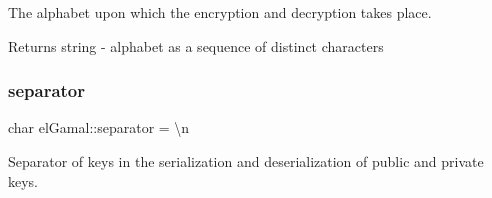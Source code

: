 The alphabet upon which the encryption and decryption takes place. 

\begin{DoxyReturn}{Returns}
string -\/ alphabet as a sequence of distinct characters 
\end{DoxyReturn}
\mbox{\label{namespaceelGamal_aa6af729a807120cdf78282b9426eac01}} 
\subsubsection{\texorpdfstring{separator}{separator}}
{\footnotesize\ttfamily char el\+Gamal\+::separator = \textquotesingle{}\textbackslash{}n\textquotesingle{}\hspace{0.3cm}{\ttfamily [static]}}



Separator of keys in the serialization and deserialization of public and private keys. 

